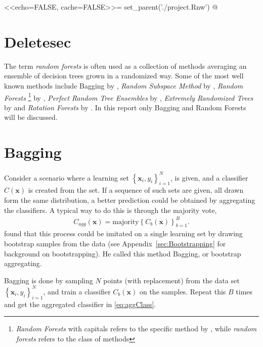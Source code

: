 <<echo=FALSE, cache=FALSE>>=
set_parent('./project.Rnw')
@
\section{Deletesec}

The term \textit{random forests} is often used as a collection of methods averaging an ensemble of decision trees grown in a randomized way. 
Some of the most well known methods include Bagging by \cite{Breiman1996}, \textit{Random Subspace Method} by \cite{ho1998random}, 
\textit{Random Forests} \footnote{\textit{Random Forests} with capitals refers to the specific method by \cite{randomforests}, while \textit{random forests} refers to the class of methods} by \cite{randomforests},
\textit{Perfect Random Tree Ensembles} by \cite{cutler2001pert}, \textit{Extremely Randomized Trees} by \cite{Geurts2006} and \textit{Rotation Forests} by \cite{Rodriguez2006}. 
In this report only Bagging and Random Forests will be discussed.

\section{Bagging}
\label{sec:Bagging}
Consider a scenario where a learning set $\left\{ \mathbf{x}_i, y_i \right\}_{i=1}^{N}$, is given, and a classifier $C(\mathbf{x})$ is created from the set. If a sequence of such sets are given, all drawn form the same distribution, a better prediction could be obtained by aggregating the classifiers. A typical way to do this is through the majority vote,
\begin{align}
  \label{eq:aggClass} 
  C_{agg}(\mathbf{x}) = \mathrm{majority} \left\{ C_b(\mathbf{x}) \right\}_{b=1}^{B}.
\end{align}
\cite{Breiman1996} found that this process could be imitated on a single learning set by drawing bootstrap samples from the data (see Appendix~\ref{sec:Bootstrapping} for background on bootstrapping). He called this method Bagging, or bootstrap aggregating. 

Bagging is done by sampling $N$ points (with replacement) from the data set $\left\{ \mathbf{x}_i, y_i \right\}_{i=1}^{N}$, and train a classifier $C_b(\mathbf{x})$ on the samples. Repeat this $B$ times and get the aggregated classifier in  \eqref{eq:aggClass}. 

